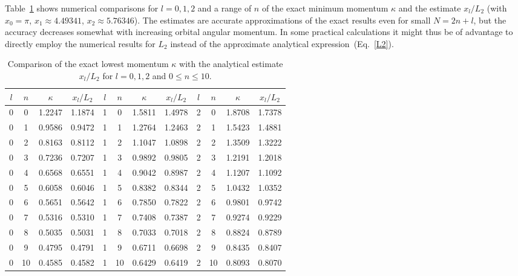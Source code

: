 	Table~\ref{tab:lowest_kappa} shows numerical comparisons for $l=0,1,2$
	and a range of $n$ of the exact minimum momentum $\kappa$ and the
	estimate $x_l/L_2$ (with $x_0=\pi$, $x_1\approx 4.49341$, $x_2\approx
	5.76346$).  The estimates are accurate approximations of the exact
	results even for small $N=2n+l$, but the accuracy decreases somewhat
	with increasing orbital angular momentum. In some practical
	calculations it might thus be of advantage to directly employ the
	numerical results for $L_2$ instead of the approximate analytical
	expression~(Eq.~\eqref{L2}).

	\begin{table}[h]
	\begin{tabular}{c|c|c|c||c|c|c|c||c|c|c|c}
	$l$& $n$ & $\kappa$  &${x_l/ L_2}$ &
	$l$& $n$ & $\kappa$  &${x_l/ L_2}$ &
	$l$& $n$ & $\kappa$  &${x_l/ L_2}$ \\
	\hline
	0 &  0  & 1.2247  & 1.1874   &
	1 &  0  & 1.5811  & 1.4978   &
	2 &  0  & 1.8708  & 1.7378   \\
	0 &  1  & 0.9586  & 0.9472   &
	1 &  1  & 1.2764  & 1.2463   &
	2 &  1  & 1.5423  & 1.4881   \\
	0 &  2  & 0.8163  & 0.8112   &
	1 &  2  & 1.1047  & 1.0898   &
	2 &  2  & 1.3509  & 1.3222   \\
	0  &  3  &  0.7236  &  0.7207  &
	1  &  3  &  0.9892  &  0.9805  &
	2 &    3  &    1.2191  &     1.2018    \\
	0   &  4   &   0.6568   &    0.6551    &
	1 &    4 &     0.9042   &    0.8987  &
	2 &    4  &    1.1207  &     1.1092   \\
	0  &   5   &   0.6058   &    0.6046    &
	1 &    5 &     0.8382   &    0.8344  &
	2 &    5   &   1.0432   &    1.0352    \\
	0  &   6   &   0.5651   &    0.5642    &
	1 &    6 &     0.7850   &    0.7822  &
	2  &   6  &    0.9801  &     0.9742  \\
	0   &  7 &     0.5316    &   0.5310    &
	1  &   7 &     0.7408   &    0.7387  &
	2 &    7  &    0.9274  &     0.9229   \\
	0  &   8    &  0.5035    &   0.5031    &
	1  &   8 &     0.7033   &    0.7018  &
	2 &    8  &    0.8824  &     0.8789   \\
	0  &  9  &    0.4795   &    0.4791     &
	1 &    9 &     0.6711   &    0.6698  &
	2  &   9   &   0.8435  &     0.8407    \\
	0  &   10 &   0.4585  &     0.4582    &
	1 &    10 &   0.6429  &     0.6419   &
	2  &   10   & 0.8093 &      0.8070  \\
	\end{tabular}
	\caption{Comparison of the exact lowest momentum $\kappa$ with the analytical
		estimate $x_l/L_2$ for $l=0, 1, 2$ and $0 \leq n \leq 10$.}
	\label{tab:lowest_kappa}
	\end{table}

